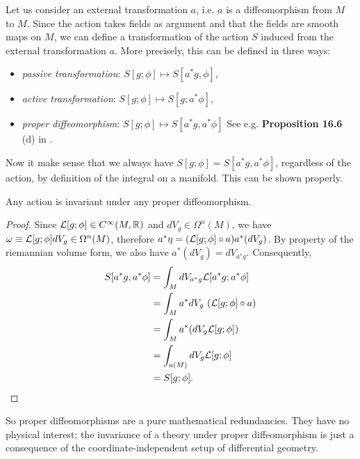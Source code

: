 \documentclass[a4paper,10pt]{article}
\begin{document}
        Let us consider an external transformation $a$, i.e. $a$ is a diffeomorphism from $M$ to $M$. Since the action takes fields as argument and that the fields are smooth maps on $M$, we can define a transformation of the action $S$ induced from the external transformation $a$. More precisely, this can be defined in three ways:
        \begin{itemize}
            \item \emph{passive transformation}: $S[g;\phi]\mapsto S[a^*g,\phi]$,
            \item \emph{active transformation}: $S[g;\phi]\mapsto S[g;a^*\phi]$,
            \item \emph{proper diffeomorphism}: $S[g;\phi]\mapsto S[a^*g,a^*\phi]$  See e.g. \textbf{Proposition 16.6} (d) in \cite{Lee_2012}.
        \end{itemize}
        Now it make sense that we always have $S[g;\phi]=S[a^*g,a^*\phi]$, regardless of the action, by definition of the integral on a manifold. This can be shown properly.
        \begin{prop}
            Any action is invariant under any proper diffeomorphism.
        \end{prop}
        \begin{proof}
            Since $\mathcal{L}[g;\phi]\in C^\infty(M,\mathbb{R})$ and $dV_g\in\Omega^n(M)$, we have $\omega\equiv\mathcal{L}[g;\phi]dV_g\in\Omega^n(M)$, therefore $a^*\eta=(\mathcal{L}[g;\phi]\circ a) a^*(dV_g)$. By property of the riemannian volume form, we also have $a^*(dV_g)=dV_{a^*g}$. Consequently,
            \begin{align}
                S[a^*g,a^*\phi] &= \int_M dV_{a^*g}\mathcal{L}[a^*g;a^*\phi] \\
                &\stackrel{\label{eq:lagcdt}}{=} \int_M a^*dV_g~(\mathcal{L}[g;\phi]\circ a) \\
                &= \int_M a^*(dV_g\mathcal{L}[g;\phi]) \\
                &= \int_{a(M)} dV_g\mathcal{L}[g;\phi] \\
                &= S[g;\phi].
            \end{align}
        \end{proof}
        So proper diffeomorphisms are a pure mathematical redundancies. They have no physical interest; the invariance of a theory under proper diffeomorphism is just a consequence of the coordinate-independent setup of differential geometry.
\end{document}
